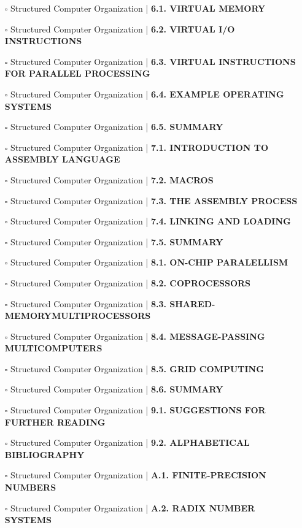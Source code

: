 \documentclass[a4, landscape, 12pt]{article}
\newcommand{\checkbox}{$\square$}%
\begin{document}
\begin{itemize}
{}
\item [\checkbox]  Structured Computer Organization | \textbf{ 6.1. VIRTUAL MEMORY
}
\item [\checkbox]  Structured Computer Organization | \textbf{ 6.2. VIRTUAL I/O INSTRUCTIONS
}
\item [\checkbox]  Structured Computer Organization | \textbf{ 6.3. VIRTUAL INSTRUCTIONS FOR PARALLEL PROCESSING
}
\item [\checkbox]  Structured Computer Organization | \textbf{ 6.4. EXAMPLE OPERATING SYSTEMS
}
\item [\checkbox]  Structured Computer Organization | \textbf{ 6.5. SUMMARY
}
\item [\checkbox]  Structured Computer Organization | \textbf{ 7.1. INTRODUCTION TO ASSEMBLY LANGUAGE
}
\item [\checkbox]  Structured Computer Organization | \textbf{ 7.2. MACROS
}
\item [\checkbox]  Structured Computer Organization | \textbf{ 7.3. THE ASSEMBLY PROCESS
}
\item [\checkbox]  Structured Computer Organization | \textbf{ 7.4. LINKING AND LOADING
}
\item [\checkbox]  Structured Computer Organization | \textbf{ 7.5. SUMMARY
}
\item [\checkbox]  Structured Computer Organization | \textbf{ 8.1. ON-CHIP PARALELLISM
}
\item [\checkbox]  Structured Computer Organization | \textbf{ 8.2. COPROCESSORS
}
\item [\checkbox]  Structured Computer Organization | \textbf{ 8.3. SHARED-MEMORYMULTIPROCESSORS
}
\item [\checkbox]  Structured Computer Organization | \textbf{ 8.4. MESSAGE-PASSING MULTICOMPUTERS
}
\item [\checkbox]  Structured Computer Organization | \textbf{ 8.5. GRID COMPUTING
}
\item [\checkbox]  Structured Computer Organization | \textbf{ 8.6. SUMMARY
}
\item [\checkbox]  Structured Computer Organization | \textbf{ 9.1. SUGGESTIONS FOR FURTHER READING
}
\item [\checkbox]  Structured Computer Organization | \textbf{ 9.2. ALPHABETICAL BIBLIOGRAPHY
}
\item [\checkbox]  Structured Computer Organization | \textbf{ A.1. FINITE-PRECISION NUMBERS
}
\item [\checkbox]  Structured Computer Organization | \textbf{ A.2. RADIX NUMBER SYSTEMS
}
\end{itemize}
\end{document}
